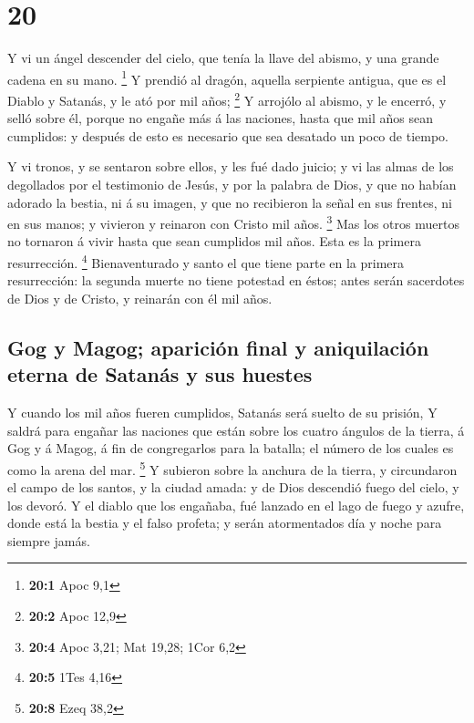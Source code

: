 \hypertarget{section-19}{%
\section{20}\label{section-19}}

 Y vi un ángel descender del cielo, que tenía la llave del
abismo, y una grande cadena en su mano. \footnote{\textbf{20:1} Apoc 9,1}
 Y prendió al dragón, aquella serpiente antigua, que es el
Diablo y Satanás, y le ató por mil años; \footnote{\textbf{20:2} Apoc
  12,9}  Y arrojólo al abismo, y le encerró, y selló sobre
él, porque no engañe más á las naciones, hasta que mil años sean
cumplidos: y después de esto es necesario que sea desatado un poco de
tiempo.

 Y vi tronos, y se sentaron sobre ellos, y les fué dado
juicio; y vi las almas de los degollados por el testimonio de Jesús, y
por la palabra de Dios, y que no habían adorado la bestia, ni á su
imagen, y que no recibieron la señal en sus frentes, ni en sus manos; y
vivieron y reinaron con Cristo mil años. \footnote{\textbf{20:4} Apoc
  3,21; Mat 19,28; 1Cor 6,2}  Mas los otros muertos no
tornaron á vivir hasta que sean cumplidos mil años. Esta es la primera
resurrección. \footnote{\textbf{20:5} 1Tes 4,16} 
Bienaventurado y santo el que tiene parte en la primera resurrección: la
segunda muerte no tiene potestad en éstos; antes serán sacerdotes de
Dios y de Cristo, y reinarán con él mil años.

\hypertarget{gog-y-magog-apariciuxf3n-final-y-aniquilaciuxf3n-eterna-de-satanuxe1s-y-sus-huestes}{%
\subsection{Gog y Magog; aparición final y aniquilación eterna de
Satanás y sus
huestes}\label{gog-y-magog-apariciuxf3n-final-y-aniquilaciuxf3n-eterna-de-satanuxe1s-y-sus-huestes}}

 Y cuando los mil años fueren cumplidos, Satanás será suelto
de su prisión,  Y saldrá para engañar las naciones que están
sobre los cuatro ángulos de la tierra, á Gog y á Magog, á fin de
congregarlos para la batalla; el número de los cuales es como la arena
del mar. \footnote{\textbf{20:8} Ezeq 38,2}  Y subieron
sobre la anchura de la tierra, y circundaron el campo de los santos, y
la ciudad amada: y de Dios descendió fuego del cielo, y los devoró.
 Y el diablo que los engañaba, fué lanzado en el lago de
fuego y azufre, donde está la bestia y el falso profeta; y serán
atormentados día y noche para siempre jamás.

